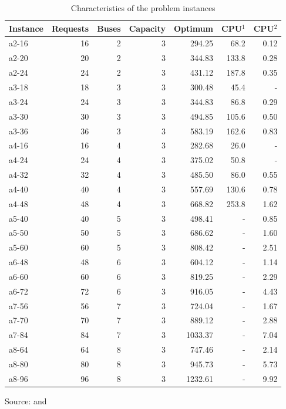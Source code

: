 \documentclass[tuberlin,cic,tc,openright,english,noabntcite,oneside]{iiufrgs}
\begin{document}
\begin{table}[H]
\centering
\caption{Characteristics of the problem instances}
\begin{tabular}{l | r | r | r | r | r | r}
\hline
Instance & Requests & Buses & Capacity & Optimum & CPU$^1$ & CPU$^2$ \\
\hline
a2-16 & 	16 & 	2 & 	3 & 	294.25 & 	68.2 & 	0.12\\
a2-20 & 	20 & 	2 & 	3 & 	344.83 & 	133.8 & 	0.28\\
a2-24 & 	24 & 	2 & 	3 & 	431.12 & 	187.8 & 	0.35\\
a3-18 & 	18 & 	3 & 	3 & 	300.48 & 	45.4 & 	-\\
a3-24 & 	24 & 	3 & 	3 & 	344.83 & 	86.8 & 	0.29\\
a3-30 & 	30 & 	3 & 	3 & 	494.85 & 	105.6 & 	0.50\\
a3-36 & 	36 & 	3 & 	3 & 	583.19 & 	162.6 & 	0.83\\
a4-16 & 	16 & 	4 & 	3 & 	282.68 & 	26.0 & 	-\\
a4-24 & 	24 & 	4 & 	3 & 	375.02 & 	50.8 & 	-\\
a4-32 & 	32 & 	4 & 	3 & 	485.50 & 	86.0 & 	0.55\\
a4-40 & 	40 & 	4 & 	3 & 	557.69 & 	130.6 & 	0.78\\
a4-48 & 	48 & 	4 & 	3 & 	668.82 & 	253.8 & 	1.62\\
a5-40 & 	40 & 	5 & 	3 & 	498.41 & 	- & 	0.85\\
a5-50 & 	50 & 	5 & 	3 & 	686.62 & 	- & 	1.60\\
a5-60 & 	60 & 	5 & 	3 & 	808.42 & 	- & 	2.51\\
a6-48 & 	48 & 	6 & 	3 & 	604.12 & 	- & 	1.14\\
a6-60 & 	60 & 	6 & 	3 & 	819.25 & 	- & 	2.29\\
a6-72 & 	72 & 	6 & 	3 & 	916.05 & 	- & 	4.43\\
a7-56 & 	56 & 	7 & 	3 & 	724.04 & 	- & 	1.67\\
a7-70 & 	70 & 	7 & 	3 & 	889.12 & 	- & 	2.88\\
a7-84 & 	84 & 	7 & 	3 & 	1033.37 & 	- & 	7.04\\
a8-64 & 	64 & 	8 & 	3 & 	747.46 & 	- & 	2.14\\
a8-80 & 	80 & 	8 & 	3 & 	945.73 & 	- & 	5.73\\
a8-96 & 	96 & 	8 & 	3 & 	1232.61 & 	- & 	9.92\\
\hline
\end{tabular}
\center Source: \parencite[p. 928]{parragh_introducing_2011} and \parencite[p. 496]{parragh_hybrid_2013}
\label{tab:instances-attributes}
\end{table}
\end{document}

